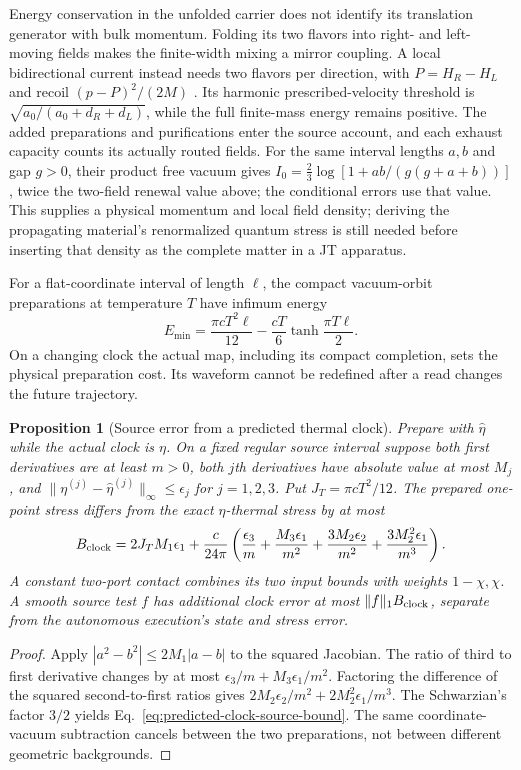 \documentclass[12pt,a4paper]{article}
\newtheorem{proposition}[theorem]{Proposition}
\begin{document}
Energy conservation in the unfolded carrier does not identify its
translation generator with bulk momentum. Folding its two flavors into
right- and left-moving fields makes the finite-width mixing a mirror
coupling. A local bidirectional current instead needs two flavors per
direction, with $P=H_R-H_L$ and recoil $(p-P)^2/(2M)$
\cite[Proposition on bidirectional current and physical recoil]{QRC}.
Its harmonic prescribed-velocity threshold is
$\sqrt{a_0/(a_0+d_R+d_L)}$, while the full finite-mass energy remains
positive. The added preparations and purifications enter the source
account, and each exhaust capacity counts its actually routed fields.
For the same interval lengths $a,b$ and gap $g>0$, their product free
vacuum gives $I_0=\frac23\log[1+ab/(g(g+a+b))]$, twice the
two-field renewal value above; the conditional errors use that value.
This supplies a physical momentum and local field density; deriving
the propagating material's renormalized quantum stress is still needed
before inserting that density as the complete matter in a JT apparatus.

For a flat-coordinate interval of length $\ell$, the compact
vacuum-orbit preparations at temperature $T$ have infimum energy
\[
 E_{\min}=\frac{\pi cT^2\ell}{12}
       -\frac{cT}{6}\tanh\frac{\pi T\ell}{2}.
\]
On a changing clock the actual map, including its compact completion,
sets the physical preparation cost. Its waveform cannot be redefined
after a read changes the future trajectory.

\begin{proposition}[Source error from a predicted thermal clock]
\label{prop:predicted-thermal-clock}
Prepare with $\widehat\eta$ while the actual clock is $\eta$.
On a fixed regular source interval suppose both first derivatives
are at least $m>0$, both $j$th derivatives have absolute value at
most $M_j$, and
$\|\eta^{(j)}-\widehat\eta^{(j)}\|_\infty\le\epsilon_j$ for
$j=1,2,3$. Put $J_T=\pi cT^2/12$. The prepared one-point stress
differs from the exact $\eta$-thermal stress by at most
\begin{equation}\label{eq:predicted-clock-source-bound}
 B_{\rm clock}=2J_TM_1\epsilon_1+\frac{c}{24\pi}
 \left(\frac{\epsilon_3}{m}+\frac{M_3\epsilon_1}{m^2}
       +\frac{3M_2\epsilon_2}{m^2}
       +\frac{3M_2^2\epsilon_1}{m^3}\right).
\end{equation}
A constant two-port contact combines its two input bounds with
weights $1-\chi,\chi$. A smooth source test $f$ has additional
clock error at most $\|f\|_1 B_{\rm clock}$, separate from the
autonomous execution's state and stress error.
\end{proposition}
\begin{proof}
Apply $|a^2-b^2|\le2M_1|a-b|$ to the squared Jacobian.
The ratio of third to first derivative changes by at most
$\epsilon_3/m+M_3\epsilon_1/m^2$.
Factoring the difference of the squared second-to-first ratios gives
$2M_2\epsilon_2/m^2+2M_2^2\epsilon_1/m^3$.
The Schwarzian's factor $3/2$ yields
Eq.~\eqref{eq:predicted-clock-source-bound}.
The same coordinate-vacuum subtraction cancels between the two
preparations, not between different geometric backgrounds.
\end{proof}
\end{document}
